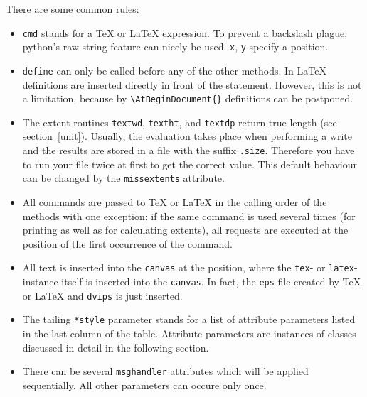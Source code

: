 There are some common rules:
\begin{itemize}
\item \verb|cmd| stands for a \TeX{} or \LaTeX{} expression. To
prevent a backslash plague, python's raw string feature can nicely be
used. \verb|x|, \verb|y| specify a position.
\item \verb|define| can only be called before any of the other
methods. In \LaTeX{} definitions are inserted directly in front of
the \verb|| statement. However, this is not a
limitation, because by \verb|\AtBeginDocument{}| definitions can be
postponed.
\item The extent routines \verb|textwd|, \verb|textht|, and
\verb|textdp| return true \PyX{} length (see section~\ref{unit}).
Usually, the evaluation takes place when performing a write and the
results are stored in a file with the suffix \verb|.size|. Therefore
you have to run your file twice at first to get the correct value.
This default behaviour can be changed by the \verb|missextents|
attribute.
\item All commands are passed to \TeX{} or \LaTeX{} in the calling
order of the methods with one exception: if the same command is used
several times (for printing as well as for calculating extents), all
requests are executed at the position of the first occurrence of the
command.
\item All text is inserted into the \verb|canvas| at the position,
where the \verb|tex|- or \verb|latex|-instance itself is inserted into
the \verb|canvas|. In fact, the \verb|eps|-file created by \TeX{} or
\LaTeX{} and \verb|dvips| is just inserted.
\item The tailing \verb|*style| parameter stands for a list of
attribute parameters listed in the last column of the table. Attribute
parameters are instances of classes discussed in detail in the
following section.
\item There can be several \verb|msghandler| attributes which will be
applied sequentially. All other parameters can occure only once.
\end{itemize}


